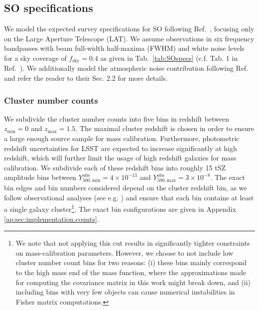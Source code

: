 \documentclass[%
 reprint,
nofootinbib,
 amsmath,amssymb,
 aps,
]{revtex4-1}
\begin{document}
\subsection{SO specifications}
We model the expected survey specifications for SO following Ref.~\cite{Ade:2019}, focusing only on the Large Aperture Telescope (LAT). We assume observations in six frequency bandpasses with beam full-width half-maxima (FWHM) and white noise levels for a sky coverage of $f_{\mathrm{sky}}=0.4$ as given in Tab.~\ref{tab:SOspecs} (c.f. Tab. 1 in Ref.~\cite{Ade:2019}). We additionally model the atmospheric noise contribution following Ref.~\cite{Ade:2019} and refer the reader to their Sec. 2.2 for more details. 
\subsubsection{Cluster number counts}
We subdivide the cluster number counts into five bins in redshift between $z_{\mathrm{min}}=0$ and $z_{\mathrm{max}}=1.5$. The maximal cluster redshift is chosen in order to ensure a large enough source sample for mass calibration. Furthermore, photometric redshift uncertainties for LSST are expected to increase significantly at high redshift, which will further limit the usage of high redshift galaxies for mass calibration. We subdivide each of these redshift bins into roughly 15 tSZ amplitude bins between $Y^{\mathrm{obs}}_{500, \mathrm{min}} = 4\times 10^{-13}$ and $Y^{\mathrm{obs}}_{500, \mathrm{max}} = 3\times 10^{-8}$. The exact bin edges and bin numbers considered depend on the cluster redshift bin, as we follow observational analyses (see e.g. \cite{Haan:2016}) and ensure that each bin contains at least a single galaxy cluster\footnote{We note that not applying this cut results in significantly tighter constraints on mass-calibration parameters. However, we choose to not include low cluster number count bins for two reasons: (i) these bins mainly correspond to the high mass end of the mass function, where the approximations made for computing the covariance matrix in this work might break down, and (ii) including bins with very few objects can cause numerical instabilities in Fisher matrix computations.}. The exact bin configurations are given in Appendix \ref{ap:sec:implementation.counts}.
\end{document}
